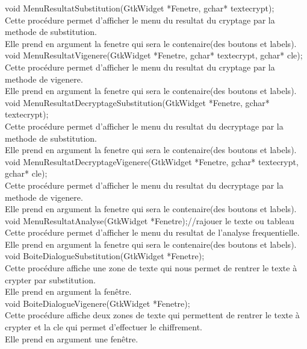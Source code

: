 \documentclass[a4]{article}
\begin{document}
	void MenuResultatSubstitution(GtkWidget *Fenetre, gchar* textecrypt);\\
		Cette procédure permet d'afficher le menu du resultat du cryptage par la methode de substitution.\\
		Elle prend en argument la fenetre qui sera le contenaire(des boutons et labels).\\
	
	void MenuResultatVigenere(GtkWidget *Fenetre, gchar* textecrypt, gchar* cle);\\
		Cette procédure permet d'afficher le menu du resultat du cryptage par la methode de vigenere.\\
		Elle prend en argument la fenetre qui sera le contenaire(des boutons et labels).\\
		
	void MenuResultatDecryptageSubstitution(GtkWidget *Fenetre, gchar* textecrypt);\\
		Cette procédure permet d'afficher le menu du resultat du decryptage par la methode de substitution.\\
		Elle prend en argument la fenetre qui sera le contenaire(des boutons et labels).\\
	
	void MenuResultatDecryptageVigenere(GtkWidget *Fenetre, gchar* textecrypt, gchar* cle);\\
		Cette procédure permet d'afficher le menu du resultat du decryptage par la methode de vigenere.\\
		Elle prend en argument la fenetre qui sera le contenaire(des boutons et labels).\\
	
	void MenuResultatAnalyse(GtkWidget *Fenetre);//rajouer le texte ou tableau\\
		Cette procédure permet d'afficher le menu du resultat de l'analyse frequentielle.\\
		Elle prend en argument la fenetre qui sera le contenaire(des boutons et labels).\\
	
	void BoiteDialogueSubstitution(GtkWidget *Fenetre);\\
		Cette procédure affiche une zone de texte qui nous permet de rentrer le texte à crypter par substitution.\\
		Elle prend en argument la fenêtre.\\
	
	void BoiteDialogueVigenere(GtkWidget *Fenetre);\\
		Cette procédure affiche deux zones de texte qui permettent de rentrer le texte à crypter et la cle qui permet d'effectuer le chiffrement.\\
		Elle prend en argument une fenêtre.\\
		
\end{document}
